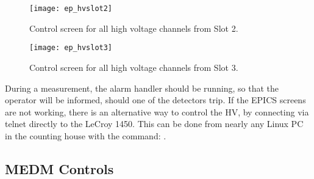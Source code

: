 {{\begin{figure}[bht]
    \begin{center}
        \texttt{[image: ep\_hvslot2]}
    \end{center}
    \caption[eP: HV Screen for Slot 2]{
	    Control screen for all high voltage channels from Slot 2.
            }
    \label{fig:ep_hvslot2} 
 \end{figure}  


 \begin{figure}[bht]
    \begin{center}
        \texttt{[image: ep\_hvslot3]}
    \end{center}
    \caption[eP: HV Screen for Slot 3]{
	    Control screen for all high voltage channels from Slot 3.
            }
    \label{fig:ep_hvslot3} 
 \end{figure}
}

During a measurement, the alarm handler should be running, so that the 
operator will be informed, should one of the detectors trip. 
If the EPICS screens are not working, there is an alternative way to 
control the HV, by connecting via telnet directly to the LeCroy 1450.
This can be done from nearly any Linux PC in the counting house with the 
command: .


\subsection{MEDM Controls}
\label{sec:ep_medm}

}
